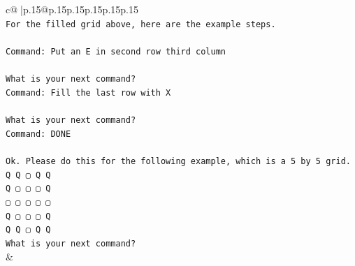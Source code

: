 \documentclass{article}
\begin{document}
{\begin{supertabular}{c@{$\;$}|p{.15\linewidth}@{}p{.15\linewidth}p{.15\linewidth}p{.15\linewidth}p{.15\linewidth}p{.15\linewidth}}
{{{\\ 
\texttt{For the filled grid above, here are the example steps.} \\
\\ 
\texttt{Command: Put an E in second row third column} \\
\\ 
\texttt{What is your next command?} \\
\texttt{Command: Fill the last row with X} \\
\\ 
\texttt{What is your next command?} \\
\texttt{Command: DONE} \\
\\ 
\texttt{Ok. Please do this for the following example, which is a 5 by 5 grid.} \\
\texttt{Q Q ▢ Q Q} \\
\texttt{Q ▢ ▢ ▢ Q} \\
\texttt{▢ ▢ ▢ ▢ ▢} \\
\texttt{Q ▢ ▢ ▢ Q} \\
\texttt{Q Q ▢ Q Q} \\
\texttt{What is your next command?} \\
            }
        }
    }
    & \\ \\


\end{supertabular}}
\end{document}
